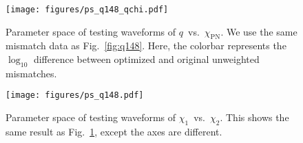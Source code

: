 \documentclass[twocolumn]{aastex631}
\begin{document}

\begin{figure}[t]
	\centering
	\texttt{[image: figures/ps\_q148\_qchi.pdf]}
	\caption{Parameter space of testing waveforms of $q$~vs.~$\chi_{\mathrm{PN}}$. We use the same mismatch data as Fig.~\ref{fig:q148}. Here, the colorbar represents the $\log_{10}$ difference between optimized and original unweighted mismatches.}
	\label{fig:ps_q148_qchi}
\end{figure}
\begin{figure}[t]
	\centering
	\texttt{[image: figures/ps\_q148.pdf]}
	\caption{Parameter space of testing waveforms of $\chi_1$~vs.~$\chi_2$. This shows the same result as Fig.~\ref{fig:ps_q148_qchi}, except the axes are different.}
	\label{fig:ps_q148}
\end{figure}
\end{document}
